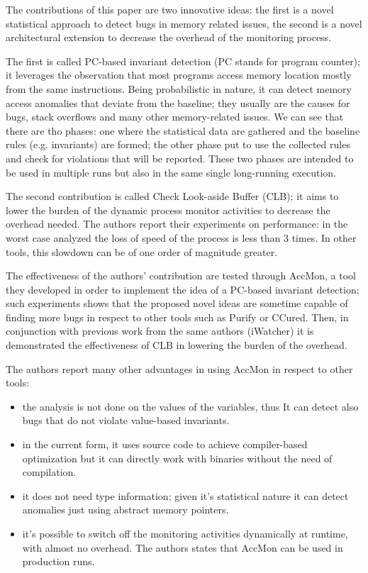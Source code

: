 The contributions of this paper are two innovative ideas: the first is a novel statistical approach to detect bugs in memory related issues, the second is a novel architectural extension to decrease the overhead of the monitoring process.

The first is called PC-based invariant detection (PC stands for program counter); it leverages the observation that most programs access memory location mostly from the same instructions. Being probabilistic in nature, it can detect memory access anomalies that deviate from the baseline; they usually are the causes for bugs, stack overflows and many other memory-related issues. We can see that there are tho phases: one where the statistical data are gathered and the baseline rules (e.g. invariants) are formed; the other phase put to use the collected rules and check for violations that will be reported.
These two phases are intended to be used in multiple runs but also in the same single long-running execution.


The second contribution is called Check Look-aside Buffer (CLB); it aims to lower the burden of the dynamic process monitor activities to decrease the overhead needed. The authors report their experiments on performance: in the worst case analyzed the loss of speed of the process is less than 3 times. In other tools, this slowdown can be of one order of magnitude greater.

The effectiveness of the authors' contribution are tested through AccMon, a tool they developed in order to implement the idea of a PC-based invariant detection; such experiments shows that the proposed novel ideas are sometime capable of finding more bugs in respect to other tools such as Purify or CCured. Then, in conjunction with previous work from the same authors (iWatcher) it is demonstrated the effectiveness of CLB in lowering the burden of the overhead.

The authors report many other advantages in using AccMon in respect to other tools:
\begin{itemize} 
\item the analysis is not done on the values of the variables, thus It can detect also bugs that do not violate value-based invariants.
\item in the current form, it uses source code to achieve compiler-based optimization but it can directly work with binaries without the need of compilation.
\item it does not need type information; given it's statistical nature it can detect anomalies just using abstract memory pointers.
\item it's possible to switch off the monitoring activities dynamically at runtime, with almost no overhead. The authors states that AccMon can be used in production runs.
\end{itemize}


